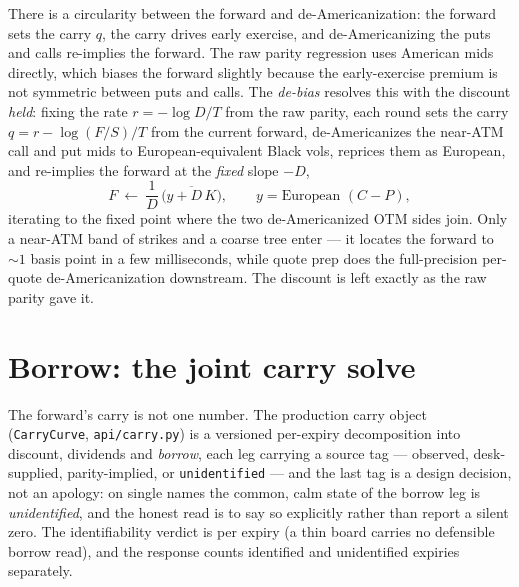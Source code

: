 \documentclass[11pt]{article}
\begin{document}
There is a circularity between the forward and de-Americanization: the forward sets
the carry $q$, the carry drives early exercise, and de-Americanizing the puts and
calls re-implies the forward. The raw parity regression uses American mids
directly, which biases the forward slightly because the early-exercise premium is
not symmetric between puts and calls. The \emph{de-bias} resolves this with the
discount \emph{held}: fixing the rate $r=-\log D/T$ from the raw parity, each round
sets the carry $q=r-\log(F/S)/T$ from the current forward, de-Americanizes the
near-ATM call and put mids to European-equivalent Black vols, reprices them as
European, and re-implies the forward at the \emph{fixed} slope $-D$,
\begin{equation}
F\ \leftarrow\ \frac{1}{D}\,\overline{\big(y+D\,K\big)},\qquad y=\text{European }(C-P),
\end{equation}
iterating to the fixed point where the two de-Americanized OTM sides join. Only a
near-ATM band of strikes and a coarse tree enter --- it locates the forward to
$\sim1$ basis point in a few milliseconds, while quote prep does the
full-precision per-quote de-Americanization downstream. The discount is left
exactly as the raw parity gave it.

\section{Borrow: the joint carry solve}
\label{sec:borrow}

The forward's carry is not one number. The production carry object
(\texttt{CarryCurve}, \texttt{api/carry.py}) is a versioned per-expiry
decomposition into discount, dividends and \emph{borrow}, each leg carrying a
source tag --- observed, desk-supplied, parity-implied, or
\texttt{unidentified} --- and the last tag is a design decision, not an
apology: on single names the common, calm state of the borrow leg is
\emph{unidentified}, and the honest read is to say so explicitly rather than
report a silent zero. The identifiability verdict is per expiry (a thin board
carries no defensible borrow read), and the response counts identified and
unidentified expiries separately.
\end{document}
